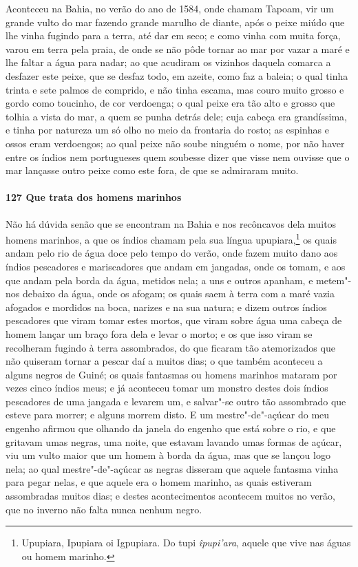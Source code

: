 \begin{linenumbers}
Aconteceu na Bahia, no verão do ano de 1584, onde chamam Tapoam, vir um grande vulto do
mar fazendo grande marulho de diante, após o peixe miúdo que lhe vinha fugindo para a
terra, até dar em seco; e como vinha com muita força, varou em terra pela praia, de onde
se não pôde tornar ao mar por vazar a maré e lhe faltar a água para nadar; ao que acudiram
os vizinhos daquela comarca a desfazer este peixe, que se desfaz todo, em azeite, como faz
a baleia; o qual tinha trinta e sete palmos de comprido, e não tinha escama, mas couro
muito grosso e gordo como toucinho, de cor verdoenga; o qual peixe era tão alto e grosso
que tolhia a vista do mar, a quem se punha detrás dele; cuja cabeça era grandíssima, e
tinha por natureza um só olho no meio da frontaria do rosto; as espinhas e ossos eram
verdoengos; ao qual peixe não soube ninguém o nome, por não haver entre os índios nem
portugueses quem soubesse dizer que visse nem ouvisse que o mar lançasse outro peixe como
este fora, de que se admiraram muito.

\paragraph{127 Que trata dos homens marinhos}\quad
Não há dúvida senão que se encontram na Bahia e nos recôncavos dela muitos homens
marinhos, a que os índios chamam pela sua língua upupiara,\footnote{ Upupiara, Ipupiara oi
Igpupiara. Do tupi \textit{îpupi'ara}, aquele que vive nas águas ou homem marinho.} os
quais andam pelo rio de água doce pelo tempo do verão, onde fazem muito dano aos índios
pescadores e mariscadores que andam em jangadas, onde os tomam, e aos que andam pela borda
da água, metidos nela; a uns e outros apanham, e metem"-nos debaixo da água, onde os
afogam; os quais saem à terra com a maré vazia afogados e mordidos na boca, narizes e na
sua natura; e dizem outros índios pescadores que viram tomar estes mortos, que viram sobre
água uma cabeça de homem lançar um braço fora dela e levar o morto; e os que isso viram se
recolheram fugindo à terra assombrados, do que ficaram tão atemorizados que não quiseram
tornar a pescar daí a muitos dias; o que também aconteceu a alguns negros de Guiné; os
quais fantasmas ou homens marinhos mataram por vezes cinco índios meus; e já aconteceu
tomar um monstro destes dois índios pescadores de uma jangada e levarem um, e salvar"-se
outro tão assombrado que esteve para morrer; e alguns morrem disto. E um mestre"-de"-açúcar
do meu engenho afirmou que olhando da janela do engenho que está sobre o rio, e que
gritavam umas negras, uma noite, que estavam lavando umas formas de açúcar, viu um vulto
maior que um homem à borda da água, mas que se lançou logo nela; ao qual mestre"-de"-açúcar
as negras disseram que aquele fantasma vinha para pegar nelas, e que aquele era o homem
marinho, as quais estiveram assombradas muitos dias; e destes acontecimentos acontecem
muitos no verão, que no inverno não falta nunca nenhum negro.


\end{linenumbers}
